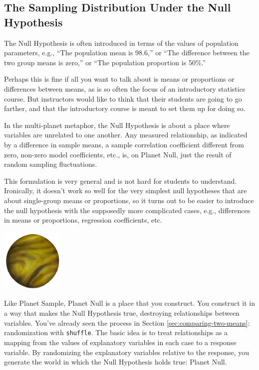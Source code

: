 \subsection{The Sampling Distribution Under the Null Hypothesis}

The Null Hypothesis is often introduced in terms of the values of
population parameters, e.g., ``The population mean is 98.6,'' or ``The
difference between the two group means is zero,'' or ``The population
proportion is 50\%.''  

Perhaps this is fine if all you want to talk about is means or proportions or
differences between means, as is so often the focus of an introductory
statistics course.  But instructors would like to think that their
students are going to go farther, and that the introductory course is
meant to set them up for doing so. 

In the multi-planet metaphor, the Null Hypothesis is about a place
where variables are unrelated to one another.  Any measured
relationship, as indicated by a difference in sample means, a sample
correlation coefficient different from zero, non-zero model
coefficients, etc., is, on Planet Null, just the result of random
sampling fluctuations.  

This formulation is very general and is not hard for students to understand.  
Ironically, it doesn't work so
well for the very simplest null hypotheses that are about single-group
means or proportions, so it turns out to be easier to introduce the
null hypothesis with the
supposedly more complicated cases, e.g., differences in means or
proportions, regression coefficients, etc.


\centerline{\includegraphics[width=1.2in]{images/venus.png}}

Like Planet Sample, Planet Null is a place that you construct.  You
construct it in a way that makes the Null Hypothesis true, destroying
relationships between variables.  
%
You've already seen the process in 
Section \ref{sec:comparing-two-means}: randomization with \texttt{shuffle}.
The basic idea is to treat relationships as a mapping from the values
of explanatory variables in each case to a response variable.  By
randomizing the explanatory variables relative to the response, you
generate the world in which the Null Hypothesis holds true: Planet Null. 

